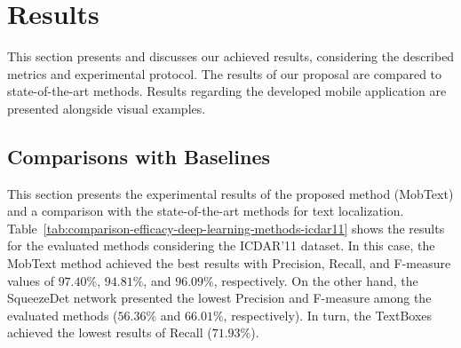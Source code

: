 \section{Results}
\label{chap:results}

This section presents and discusses our achieved results, considering the described metrics and experimental protocol. The results of our proposal are compared to state-of-the-art methods. Results regarding the developed mobile application are presented alongside visual examples.

\subsection{Comparisons with Baselines}

This section presents the experimental results of the proposed method (MobText) and a comparison with the state-of-the-art methods for text localization. Table~\ref{tab:comparison-efficacy-deep-learning-methods-icdar11} shows the results for the evaluated methods considering the ICDAR'11 dataset. In this case, the MobText method achieved the best results with Precision, Recall, and F-measure values of $97.40\%$, $94.81\%$, and $96.09\%$, respectively. On the other hand, the SqueezeDet network presented the lowest Precision and F-measure among the evaluated methods ($56.36\%$ and $66.01\%$, respectively). In turn, the TextBoxes achieved the lowest results of Recall ($71.93\%$).
%
\begin{table}[!h]
    \centering
    \caption{Comparison of effectiveness among the evaluated deep learning-based methods for the ICDAR'11 dataset.}
    \label{tab:comparison-efficacy-deep-learning-methods-icdar11}
\end{table}

